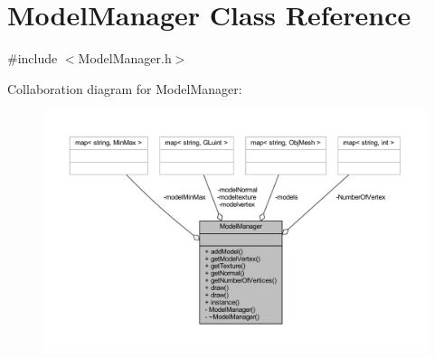 \section{Model\+Manager Class Reference}
\label{class_model_manager}


{\ttfamily \#include $<$Model\+Manager.\+h$>$}



Collaboration diagram for Model\+Manager\+:\nopagebreak
\begin{figure}[H]
\begin{center}
\leavevmode
\includegraphics[width=350pt]{dc/d4e/class_model_manager__coll__graph}
\end{center}
\end{figure}
